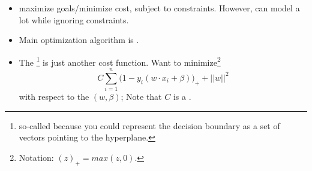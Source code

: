 \documentclass[12pt]{article}
\begin{document}
\begin{itemize}
	\item {} maximize goals/minimize cost, subject to constraints. However, can model a lot while ignoring constraints.
	\item Main optimization algorithm is .
	\item The \footnote{so-called because you could represent the decision boundary as a set of vectors pointing to the hyperplane.} is just another cost function. Want to minimize\footnote{Notation: $(z)_+ = max(z, 0)$.}
	\begin{equation}
	C \displaystyle\sum_{i=1}^{n} \big(1 - y_i ( w \cdot x_i + \beta) \big)_+ + ||w||^2
	\end{equation}
	with respect to the  $(w, \beta)$; Note that $C$ is a .
\end{itemize}

%


\end{document}
